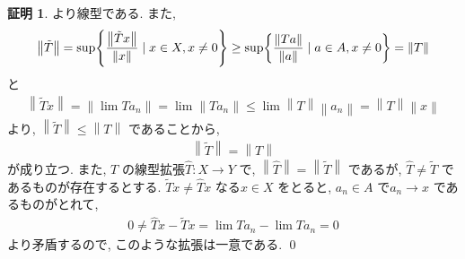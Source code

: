 \documentclass[10pt, fleqn, label-section=none]{bxjsarticle}
\theoremstyle{definition}
\newtheorem*{pf*}{証明}
\newcommand{\cbra}[1]{\mleft\{#1\mright\}}
\newcommand{\norm}[1]{\left\|#1\right\|}
\renewcommand{\;}{\, ; \,}
\begin{document}
\begin{pf*}
より線型である. また, 
\begin{align*} \norm{\tilde T} = \sup \cbra{ \frac{\norm{\tilde T x}}{\norm x} \mid x \in X, x \neq 0 }  \geq \sup \cbra{ \frac{\norm{T a}}{\norm a} \mid a \in A, x \neq 0 } = \norm{T} \end{align*} と
\begin{align*} \norm{\tilde T x} = \norm{\lim T a_n} = \lim \norm{T a_n} \leq \lim \norm{T} \norm{a_n} = \norm{T} \norm{x}  \end{align*}
より, $\norm{\tilde T} \leq \norm{T}$ であることから, 
\begin{align*} \norm{ \tilde T} = \norm{T} \end{align*}
が成り立つ. また, $T$ の線型拡張$\hat T: X \rightarrow Y$ で, $\norm {\hat T} = \norm{ \tilde T}$ であるが, $\hat T \neq \tilde T$ であるものが存在するとする. $\tilde T x \neq \hat T x$ なる$x \in X$ をとると, $a_n \in A$ で$a_n \rightarrow x$ であるものがとれて, 
\begin{align*} 0 \neq \hat T x - \tilde T x = \lim T a_n - \lim T a_n = 0 \end{align*} 
より矛盾するので, このような拡張は一意である. 
\qed
\end{pf*}
\end{document}
